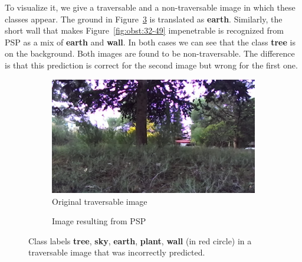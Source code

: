 \documentclass[12pt,a4paper,table,dvipsnames,tikz]{report}
\newcommand{\acronym}{\MakeUppercase}
\newcommand{\bl}[1]{{\hypersetup{linkcolor=blue}#1}}
\newcommand{\class}[1]{\textbf{\textcolor{#1}{#1}}} %
\begin{document}
	
	To visualize it, we give a traversable and a non-traversable image in which these 
	classes appear. The ground in Figure~\bl{\ref{fig:trav:28_57}} is translated as 
	\class{earth}. Similarly, the short wall that makes Figure~\bl{\ref{fig:obst:32-49}} 
	impenetrable is recognized from \acronym{psp} as a mix of \class{earth} and \class{wall}.	
	In both cases we can see that the class \class{tree} is on the background. Both 
	images are found to be non-traversable. The difference is that this prediction is 
	correct for the second image but wrong for the first one.
	\\
	
	\begin{figure}[h!]
		\centering
		\begin{subfigure}[b]{0.45\textwidth}
			\includegraphics[width=\textwidth]{28_57_0000t}
			\caption{Original traversable image}
			\label{fig:trav:28_57:orig}
		\end{subfigure}
		\begin{subfigure}[b]{0.45\textwidth}
			\caption{Image resulting from \acronym{psp}}
			\label{fig:trav:28_57:psp}
		\end{subfigure}
		\caption{Class labels \class{tree}, \class{sky}, \class{earth}, \class{plant}, 
			\class{wall} (in red circle) in a traversable image that was incorrectly 
			predicted.}
		\label{fig:trav:28_57}
	\end{figure}
	
\end{document}
